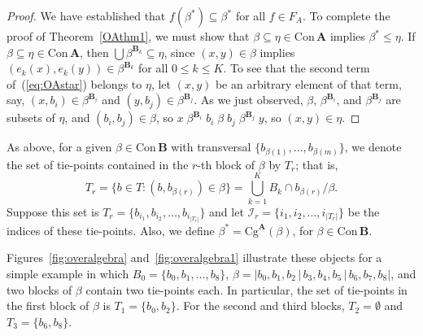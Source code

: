 \documentclass[cm,dissertation,actual,final]{uhthesis}
\theoremstyle{plain}
\theoremstyle{definition}
\theoremstyle{remark}
\numberwithin{theorem}{section}
\numberwithin{claim}{chapter}
\numberwithin{equation}{section}
\numberwithin{conjecture}{chapter}
\newcommand{\<}{\ensuremath{\langle}}
\renewcommand{\>}{\ensuremath{\rangle}}
\renewcommand{\leq}{\ensuremath{\leqslant}}
\newcommand{\Cg}{\ensuremath{\mathrm{Cg}}}
\newcommand{\Con}{\ensuremath{\mathrm{Con\,}}}
\newcommand{\0}{\ensuremath{\mathbf{0}}}
\newcommand{\1}{\ensuremath{\mathbf{1}}}
\newcommand{\2}{\ensuremath{\mathbf{2}}}
\newcommand{\3}{\ensuremath{\mathbf{3}}}
\newcommand{\4}{\ensuremath{\mathbf{4}}}
\newcommand{\5}{\ensuremath{\mathbf{5}}}
\newcommand{\bA}{\ensuremath{\mathbf{A}}}
\newcommand{\bB}{\ensuremath{\mathbf{B}}}
\newcommand{\sI}{\ensuremath{\mathscr{I}}}
\begin{document}
\begin{proof}
  We have established that $f(\beta^*)\subseteq \beta^*$ for all $f\in F_A$.  To
  complete the proof of Theorem~\ref{OAthm1}, we must show that
  $\beta \subseteq \eta \in \Con \bA$ implies
  $\beta^*\leq \eta$.
  If $\beta \subseteq \eta\in \Con \bA$, then $\bigcup \beta^{\bB_k} \subseteq
  \eta$, since $(x,y)\in \beta$ implies $(e_k(x), e_k(y))\in \beta^{\bB_k}$ for all
  $0\leq k\leq K$.  To see that the second term of~(\ref{eq:OAstar}) belongs to
  $\eta$, let $(x,y)$ be an arbitrary element of that term, say, $(x, b_i) \in
  \beta^{\bB_i}$ and $(y, b_j)\in \beta^{\bB_j}$.  As we just observed, $\beta,\,
  \beta^{\bB_i}$, and $\beta^{\bB_j}$ are subsets of $\eta$, and $(b_i, b_j) \in
  \beta$, so $x \; \beta^{\bB_i}\; b_i \; \beta \; b_j \;\beta^{\bB_j} \; y$, so 
  $(x,y)\in \eta$.

\end{proof}

As above, for a given $\beta \in \Con \bB$ with transversal
$\{b_{\beta(1)}, \dots, b_{\beta(m)}\}$, we denote
the set of tie-points contained in the $r$-th block of $\beta$ by $T_r$; that is,
\[
T_r = \{b\in T : (b, b_{\beta(r)}) \in \beta\}
=  \bigcup_{k=1}^K B_k \cap b_{\beta(r)}/\beta.
\]
Suppose this set %
is $T_r = \{b_{i_1}, b_{i_2}, \dots, b_{i_{|T_r|}}\}$ and let 
$\sI_r = \{i_1, i_2, \dots, i_{|T_r|}\}$ be the indices of these tie-points.   
Also, we define $\beta^*=\Cg^\bA(\beta)$, for $\beta\in\Con \bB$.

Figures~\ref{fig:overalgebra} and~\ref{fig:overalgebra1} illustrate these
objects for a simple example in which $B_0 = \{b_0, b_1, \dots, b_8\}$, $\beta =
|b_0, b_1, b_2 \,|\,b_3, b_4, b_5\,|\,b_6, b_7, b_8|$, and two blocks of $\beta$ contain
two tie-points each.  In particular,  the set of tie-points in the first block
of $\beta$ is $T_1 = \{b_0, b_2\}$. For the second and third blocks,
$T_2 = \emptyset$ and $T_3 = \{b_6, b_8\}$.
\end{document}
